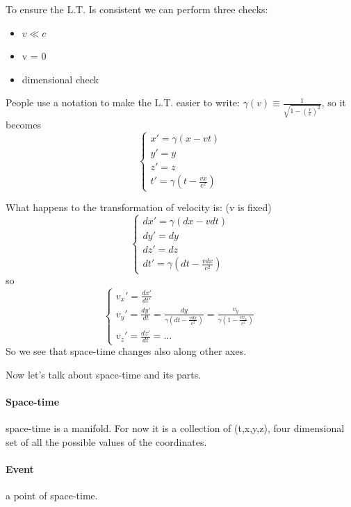 \documentclass{report}
\begin{document}
To ensure the L.T. Is consistent we can perform three checks:
\begin{itemize}
	\item $v \ll c$
	\item v = 0
	\item dimensional check
\end{itemize}
People use a notation to make the L.T. easier to write: $\gamma(v) \equiv \frac{1}{\sqrt{1-(\frac{v}{c})^{2}}} $, so it becomes
\begin{equation}
\begin{cases}
x' = \gamma (x-vt) \\
y' = y \\
z' = z \\
t' = \gamma (t- \frac{vx}{c^{2}})
\end{cases}
\end{equation}

What happens to the transformation of velocity is: (v is fixed) 
\begin{equation}
\begin{cases}
dx' = \gamma(dx -vdt) \\
dy' = dy \\
dz' = dz \\
dt' = \gamma \left(dt - \frac{v dx}{c^{2}}\right)
\end{cases}
\end{equation}
 so 
\begin{equation}
\begin{cases}
 v_{x}' = \frac{dx'}{dt'} \\
 v_{y}' = \frac{dy'}{dt} = \frac{dy}{\gamma \left(dt - \frac{vdx}{c^{2}}\right)} = \frac{v_{y}}{\gamma \left(1- \frac{v v_{x}}{c^{2}}\right)} \\
v_{z}' = \frac{dz'}{dt} = ...
\end{cases}
\end{equation}
So we see that space-time changes also along other axes.\par

Now let's talk about space-time and its parts.

\paragraph{Space-time} space-time is a manifold. For now it is a collection of (t,x,y,z), four dimensional set of all the possible values of the coordinates.
\paragraph{Event} a point of space-time.
\end{document}
